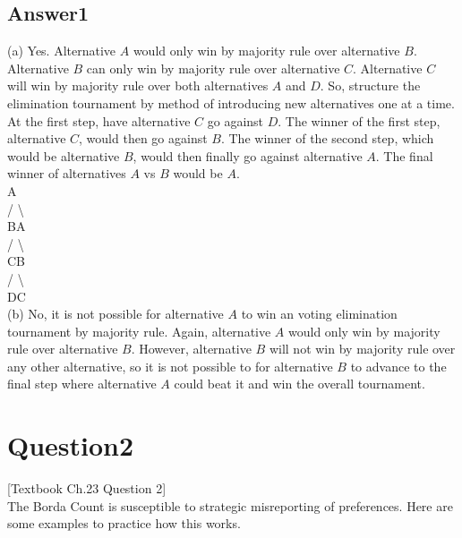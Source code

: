 \documentclass[twoside]{article}
\begin{document}
\subsection{Answer1}

(a) Yes. Alternative $A$ would only win by majority rule over alternative $B$. Alternative $B$ can only win by majority rule over alternative $C$. Alternative $C$ will win by majority rule over both alternatives $A$ and $D$. So, structure the elimination tournament by method of introducing new alternatives one at a time. At the first step, have alternative $C$ go against $D$. The winner of the first step, alternative $C$, would then go against $B$. The winner of the second step, which would be alternative $B$, would then finally go against alternative $A$. The final winner of alternatives $A$ vs $B$ would be $A$. \\

\hspace*{19mm}A \\
\hspace*{18mm}/ \textbackslash \\
\hspace*{16mm}B\hspace*{4mm}A \\
\hspace*{15mm}/ \textbackslash \\
\hspace*{13mm}C\hspace*{4mm}B \\
\hspace*{12mm}/ \textbackslash \\
\hspace*{10mm}D\hspace*{4mm}C \\

(b) No, it is not possible for alternative $A$ to win an voting elimination tournament by majority rule. Again, alternative $A$ would only win by majority rule over alternative $B$. However, alternative $B$ will not win by majority rule over any other alternative, so it is not possible to for alternative $B$ to advance to the final step where alternative $A$ could beat it and win the overall tournament.


\section{Question2}
[Textbook Ch.23 Question 2] \\
The Borda Count is susceptible to strategic misreporting of preferences. Here are some examples to practice how this works. \\
\end{document}
